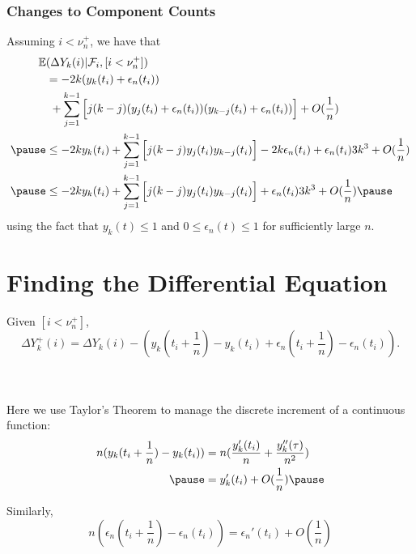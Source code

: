 \documentclass{beamer}
\begin{document}
\begin{frame}
  \frametitle{Changes to Component Counts}
  Assuming \(i < \nu_{n}^{+}\), we have that
  \[
    \begin{aligned}
      \mathbb{E}&(\Delta Y_{k}(i)|\mathcal{F}_{i}, [i < \nu_{n}^{+}])  \\
      &= -2 k (y_{k}(t_{i}) + \epsilon_{n}(t_{i})) \\
      &\hbox{ }+ \sum\limits_{j=1}^{k-1} \Big[ j (k - j) (y_{j}(t_{i}) + \epsilon_{n}(t_{i})) (y_{k-j}(t_{i}) + \epsilon_{n}(t_{i})) \Big] + O(\frac{1}{n}) \\ \pause
      &\leq -2 k y_{k}(t_{i}) + \sum\limits_{j=1}^{k-1} \Big[ j (k - j) y_{j}(t_{i})y_{k-j}(t_{i})\Big] -2 k \epsilon_{n}(t_{i}) + \epsilon_{n}(t_{i}) 3 k^{3} + O(\frac{1}{n}) \\ \pause
      &\leq -2 k y_{k}(t_{i}) + \sum\limits_{j=1}^{k-1} \Big[ j (k - j) y_{j}(t_{i})y_{k-j}(t_{i})\Big] + \epsilon_{n}(t_{i}) 3 k^{3} + O(\frac{1}{n}) \pause
    \end{aligned}
  \]
  using the fact that \(y_{k}(t) \leq 1\) and \(0 \leq \epsilon_{n}(t) \leq 1\) for sufficiently large \(n\).
\end{frame}

\section{Finding the Differential Equation}

\begin{frame}
Given \([i < \nu_{n}^{+}]\), 
\[\Delta Y_{k}^{+}(i) = \Delta Y_{k}(i) - (y_{k}(t_{i} + \frac{1}{n}) - y_{k}(t_{i}) + \epsilon_{n}(t_{i} + \frac{1}{n}) - \epsilon_{n}(t_{i})).\] \\~\ \pause

Here we use Taylor's Theorem to manage the discrete increment of a continuous function: \pause
\[
  \begin{aligned}
    n(y_{k}(t_{i} + \frac{1}{n}) - y_{k}(t_{i})) &= n(\frac{y_{k}'(t_{i})}{n} + \frac{y_{k}''(\tau)}{n^{2}}) \\ \pause
    &= y_{k}'(t_{i}) + O(\frac{1}{n}) \pause
  \end{aligned}
\]

Similarly,
\[n(\epsilon_{n}(t_{i} + \frac{1}{n}) - \epsilon_{n}(t_{i})) = \epsilon_{n}'(t_{i}) + O(\frac{1}{n})\]
\end{frame}
\end{document}
